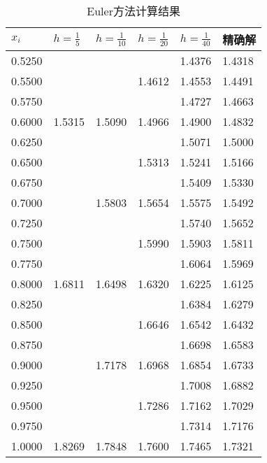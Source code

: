 \documentclass[12pt, a4paper, oneside]{ctexart}
\begin{document}
\begin{table}[h]
    \begin{minipage}[t]{0.48\textwidth}\centering
    \begin{tabular}{@{}llllll@{}}
        \toprule
        $x_i$      & $h=\frac{1}{5}$  & $h=\frac{1}{10}$ & $h=\frac{1}{20}$ & $h=\frac{1}{40}$ & 精确解    \\ \midrule
        0.5250 &     &     &     & 1.4376 & 1.4318 \\
        0.5500 &     &     & 1.4612 & 1.4553 & 1.4491 \\
        0.5750 &     &     &     & 1.4727 & 1.4663 \\
        0.6000 & 1.5315 & 1.5090 & 1.4966 & 1.4900 & 1.4832 \\
        0.6250 &     &     &     & 1.5071 & 1.5000 \\
        0.6500 &     &     & 1.5313 & 1.5241 & 1.5166 \\
        0.6750 &     &     &     & 1.5409 & 1.5330 \\
        0.7000 &     & 1.5803 & 1.5654 & 1.5575 & 1.5492 \\
        0.7250 &     &     &     & 1.5740 & 1.5652 \\
        0.7500 &     &     & 1.5990 & 1.5903 & 1.5811 \\
        0.7750 &     &     &     & 1.6064 & 1.5969 \\
        0.8000 & 1.6811 & 1.6498 & 1.6320 & 1.6225 & 1.6125 \\
        0.8250 &     &     &     & 1.6384 & 1.6279 \\
        0.8500 &     &     & 1.6646 & 1.6542 & 1.6432 \\
        0.8750 &     &     &     & 1.6698 & 1.6583 \\
        0.9000 &     & 1.7178 & 1.6968 & 1.6854 & 1.6733 \\
        0.9250 &     &     &     & 1.7008 & 1.6882 \\
        0.9500 &     &     & 1.7286 & 1.7162 & 1.7029 \\
        0.9750 &     &     &     & 1.7314 & 1.7176 \\
        1.0000 & 1.8269 & 1.7848 & 1.7600 & 1.7465 & 1.7321 \\ \bottomrule
        \end{tabular}
    \end{minipage}
	\caption{Euler方法计算结果} \label{fig:euler1}
\end{table}
\end{document}
